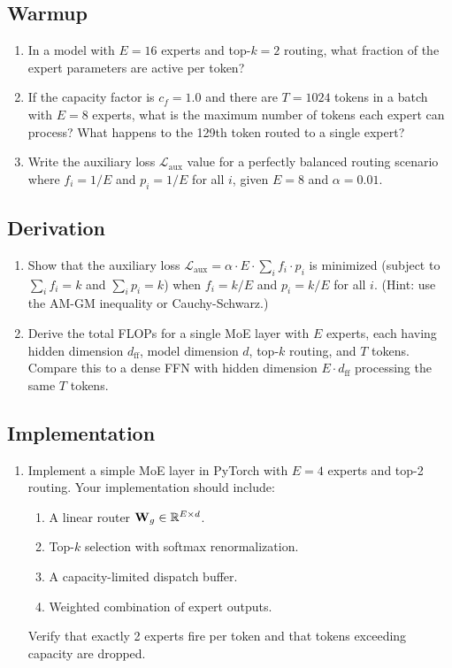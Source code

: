 \subsection*{Warmup}
\begin{enumerate}
  \item In a model with $E = 16$ experts and top-$k = 2$ routing, what fraction of the expert parameters are active per token?
  \item If the capacity factor is $c_f = 1.0$ and there are $T = 1024$ tokens in a batch with $E = 8$ experts, what is the maximum number of tokens each expert can process? What happens to the 129th token routed to a single expert?
  \item Write the auxiliary loss $\mathcal{L}_{\text{aux}}$ value for a perfectly balanced routing scenario where $f_i = 1/E$ and $p_i = 1/E$ for all $i$, given $E = 8$ and $\alpha = 0.01$.
\end{enumerate}

\subsection*{Derivation}
\begin{enumerate}
  \item Show that the auxiliary loss $\mathcal{L}_{\text{aux}} = \alpha \cdot E \cdot \sum_i f_i \cdot p_i$ is minimized (subject to $\sum_i f_i = k$ and $\sum_i p_i = k$) when $f_i = k/E$ and $p_i = k/E$ for all $i$. (Hint: use the AM-GM inequality or Cauchy-Schwarz.)
  \item Derive the total FLOPs for a single MoE layer with $E$ experts, each having hidden dimension $d_{\text{ff}}$, model dimension $d$, top-$k$ routing, and $T$ tokens. Compare this to a dense FFN with hidden dimension $E \cdot d_{\text{ff}}$ processing the same $T$ tokens.
\end{enumerate}

\subsection*{Implementation}
\begin{enumerate}
  \item Implement a simple MoE layer in PyTorch with $E=4$ experts and top-2 routing. Your implementation should include:
  \begin{enumerate}
    \item A linear router $\mathbf{W}_g \in \mathbb{R}^{E \times d}$.
    \item Top-$k$ selection with softmax renormalization.
    \item A capacity-limited dispatch buffer.
    \item Weighted combination of expert outputs.
  \end{enumerate}
  Verify that exactly 2 experts fire per token and that tokens exceeding capacity are dropped.
\end{enumerate}


